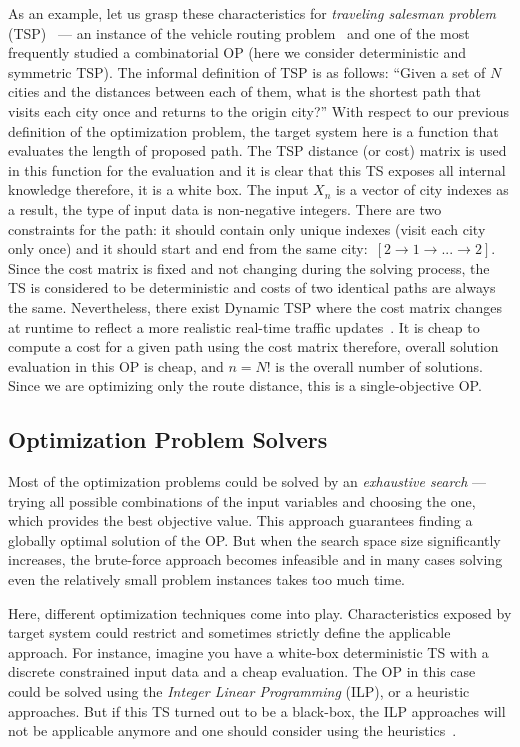 As an example, let us grasp these characteristics for \emph{traveling salesman problem} (TSP)~\cite{applegate2006traveling} — an instance of the vehicle routing problem~\cite{laporte1992vehicle} and one of the most frequently studied a combinatorial OP (here we consider deterministic and symmetric TSP).
The informal definition of TSP is as follows: ``Given a set of $N$ cities and the distances between each of them, what is the shortest path that visits each city once and returns to the origin city?''
With respect to our previous definition of the optimization problem, the target system here is a function that evaluates the length of proposed path. The TSP distance (or cost) matrix is used in this function for the evaluation and it is clear that this TS exposes all internal knowledge therefore, it is a white box.
The input $X_n$ is a vector of city indexes as a result, the type of input data is non-negative integers. There are two constraints for the path: it should contain only unique indexes (visit each city only once) and it should start and end from the same city:~$[2 \rightarrow 1 \rightarrow ... \rightarrow 2]$.
Since the cost matrix is fixed and not changing during the solving process, the TS is considered to be deterministic and costs of two identical paths are always the same. Nevertheless, there exist Dynamic TSP where the cost matrix changes at runtime to reflect a more realistic real-time traffic updates~\cite{cheong2011dynamic}.
It is cheap to compute a cost for a given path using the cost matrix therefore, overall solution evaluation in this OP is cheap, and $n = N!$ is the overall number of solutions. Since we are optimizing only the route distance, this is a single-objective OP.


\subsection{Optimization Problem Solvers}\label{BG: subsection OP Solvers}
Most of the optimization problems could be solved by an \emph{exhaustive search} — trying all possible combinations of the input variables and choosing the one, which provides the best objective value. This approach guarantees finding a globally optimal solution of the OP. But when the search space size significantly increases, the brute-force approach becomes infeasible and in many cases solving even the relatively small problem instances takes too much time.

Here, different optimization techniques come into play. Characteristics exposed by target system could restrict and sometimes strictly define the applicable approach.
For instance, imagine you have a white-box deterministic TS with a discrete constrained input data and a cheap evaluation. The OP in this case could be solved using the \emph{Integer Linear Programming} (ILP), or a heuristic approaches. But if this TS turned out to be a black-box, the ILP approaches will not be applicable anymore and one should consider using the heuristics~\cite{biegler2004retrospective}.

